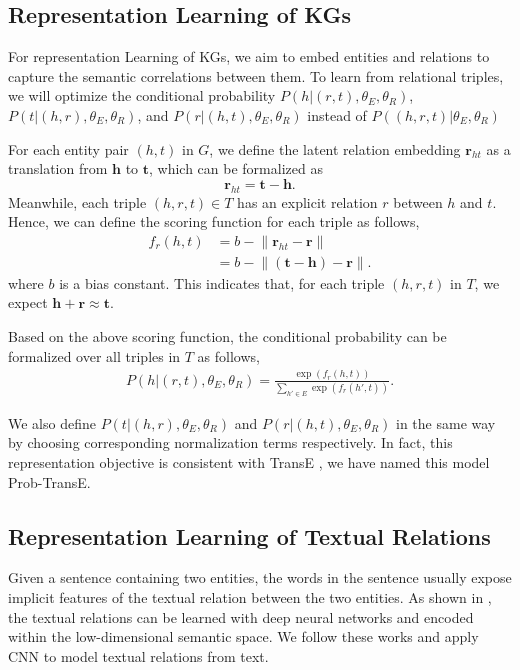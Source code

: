 \documentclass[11pt,a4paper]{article}
\begin{document}
\subsection{Representation Learning of KGs}
\label{sec:kg}
For representation Learning of KGs, we aim to embed entities and relations to capture the semantic correlations between them. To learn from relational triples, we will optimize the conditional probability $P(h|(r, t),{\theta_E, \theta_R})$, $P(t|(h, r),{\theta_E, \theta_R})$, and $P(r|(h, t),{\theta_E, \theta_R})$ instead of $P((h, r, t)|{\theta_E, \theta_R})$

For each entity pair $(h, t)$ in $G$, we define the latent relation embedding $\mathbf{r}_{ht}$ as a translation from $\mathbf{h}$ to $\mathbf{t}$, which can be formalized as
\begin{equation}
\textbf{r}_{ht} = \textbf{t} - \textbf{h}.
\end{equation}
Meanwhile, each triple $(h, r, t) \in T$ has an explicit relation $r$ between $h$ and $t$. Hence, we can define the scoring function for each triple as follows,
\begin{align}
f_r(h, t) & = b - \lVert \textbf{r}_{ht} - \textbf{r} \rVert  \\\nonumber
		& = b - \lVert (\textbf{t} - \textbf{h}) - \textbf{r}  \rVert.
\end{align}
where $b$ is a bias constant. This indicates that, for each triple $(h, r, t)$ in $T$, we expect $\textbf{h} + \textbf{r} \approx \textbf{t}$.

Based on the above scoring function, the conditional probability can be formalized over all triples in $T$ as follows,
\begin{align}
P(h|(r, t),{\theta_E, \theta_R}) = \frac{\exp(f_r(h, t))}{\sum_{h' \in E} \exp(f_r(h', t))}.
\end{align}

We also define $P(t|(h, r), {\theta_E, \theta_R})$ and $P(r|(h, t),{\theta_E, \theta_R})$ in the same way by choosing corresponding normalization terms respectively. In fact, this representation objective is consistent with TransE \cite{bordes2013translating}, we have named this model Prob-TransE.

\subsection{Representation Learning of Textual Relations}
\label{sec:relation}

Given a sentence containing two entities, the words in the sentence usually expose implicit features of the textual relation between the two entities. As shown in \cite{zeng2014relation,toutanova2015representing,lin2016neural}, the textual relations can be learned with deep neural networks and encoded within the low-dimensional semantic space. We follow these works and apply CNN to model textual relations from text. 
\end{document}
